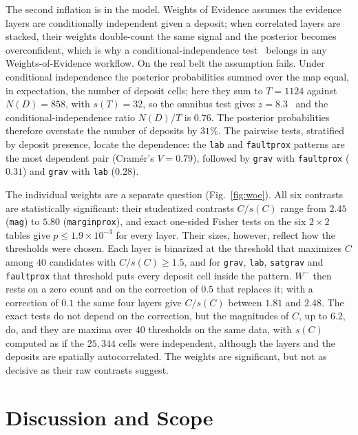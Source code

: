 \documentclass[journal]{IEEEtran}
\begin{document}
The second inflation is in the model. Weights of Evidence assumes the evidence layers are conditionally
independent given a deposit; when correlated layers are stacked, their weights double-count the same signal and
the posterior becomes overconfident, which is why a conditional-independence test~\cite{agterberg} belongs in any
Weights-of-Evidence workflow. On the real belt the assumption fails. Under conditional independence the posterior
probabilities summed over the map equal, in expectation, the number of deposit cells; here they sum to
$T = 1124$ against $N(D) = 858$, with $s(T) = 32$, so the omnibus test gives $z = 8.3$~\cite{agterberg} and the
conditional-independence ratio $N(D)/T$ is $0.76$. The posterior probabilities therefore overstate the number of
deposits by $31\%$. The pairwise tests, stratified by deposit presence, locate the dependence: the \texttt{lab}
and \texttt{faultprox} patterns are the most dependent pair (Cram\'er's $V = 0.79$), followed by \texttt{grav}
with \texttt{faultprox} ($0.31$) and \texttt{grav} with \texttt{lab} ($0.28$).

The individual weights are a separate question (Fig.~\ref{fig:woe}). All six contrasts are statistically
significant: their studentized contrasts $C/s(C)$ range from $2.45$ (\texttt{mag}) to $5.80$
(\texttt{marginprox}), and exact one-sided Fisher tests on the six $2\times2$ tables give $p \le 1.9\times10^{-3}$
for every layer. Their sizes, however, reflect how the thresholds were chosen. Each layer is binarized at the
threshold that maximizes $C$ among $40$ candidates with $C/s(C) \ge 1.5$, and for \texttt{grav}, \texttt{lab},
\texttt{satgrav} and
\texttt{faultprox} that threshold puts every deposit cell inside the pattern. $W^-$ then rests on a zero count and
on the correction of $0.5$ that replaces it; with a correction of $0.1$ the same four layers give $C/s(C)$ between
$1.81$ and $2.48$. The exact tests do not depend on the correction, but the magnitudes of $C$, up to $6.2$, do, and
they are maxima over $40$ thresholds on the same data, with $s(C)$ computed as if the $25{,}344$ cells were
independent, although the layers and the deposits are spatially autocorrelated. The weights are significant, but
not as decisive as their raw contrasts suggest.

\section{Discussion and Scope}\label{sec:discuss}
\end{document}
